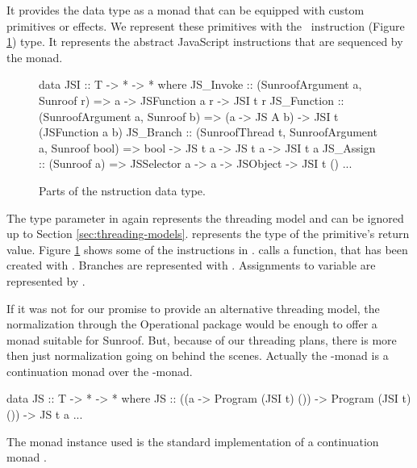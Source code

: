 It provides the  data type as a monad that
can be equipped with custom primitives or effects.
We represent these primitives with the \JSI~instruction 
(Figure \ref{fig:jsi-definition}) type. It represents the 
abstract JavaScript instructions that are sequenced by the 
monad.
\begin{figure}
\begin{Code}
data JSI :: T -> * -> * where
  JS_Invoke   :: (SunroofArgument a, Sunroof r) 
              => a -> JSFunction a r -> JSI t r
  JS_Function :: (SunroofArgument a, Sunroof b) 
              => (a -> JS A b) -> JSI t (JSFunction a b)
  JS_Branch   :: (SunroofThread t, SunroofArgument a, Sunroof bool) 
              => bool -> JS t a -> JS t a  -> JSI t a
  JS_Assign   :: (Sunroof a) 
              => JSSelector a -> a -> JSObject -> JSI t ()
  ...
\end{Code}
\caption{Parts of the \JSI nstruction data type.}
\label{fig:jsi-definition}
\end{figure}
The type parameter  in  again represents 
the threading model and can be ignored up to Section \ref{sec:threading-models}. 
 represents the type of the primitive's return value. 
Figure \ref{fig:jsi-definition} shows some of the instructions
in \JSI.
 calls a function, that has been created with .
Branches are represented with . Assignments to variable
are represented by .

If it was not for our promise to provide an alternative 
threading model, the normalization through the Operational package
would be enough to offer a monad suitable for Sunroof.
But, because of our threading plans, there is more then just 
normalization going on behind the scenes. 
Actually the \JS-monad is a continuation monad over the 
-monad.
\begin{Code}
data JS :: T -> * -> * where
  JS :: ((a -> Program (JSI t) ()) -> Program (JSI t) ()) -> JS t a
  ...
\end{Code}
The monad instance used is the standard implementation of 
a continuation monad .



